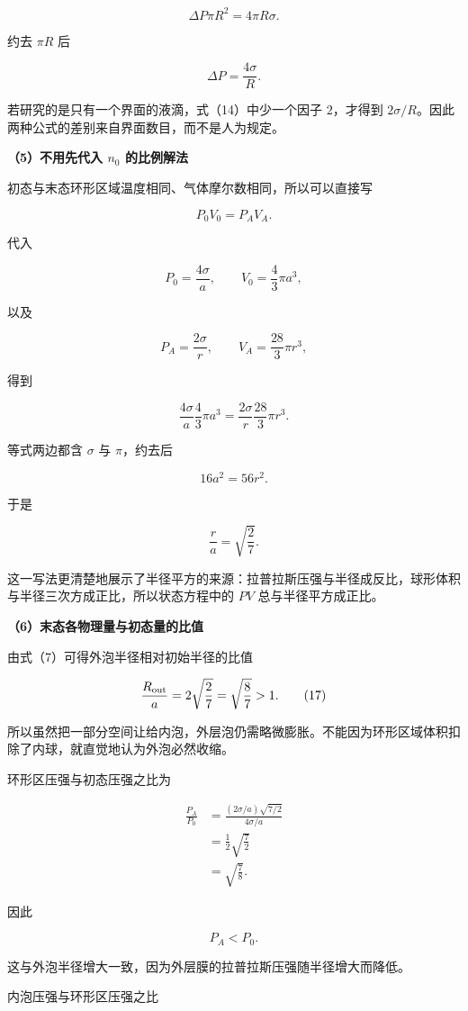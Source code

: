 \documentclass[12pt,a4paper,UTF8]{ctexart}
\begin{document}
\[
\Delta P\pi R^2=4\pi R\sigma.
\]

约去 \(\pi R\) 后

\[
\Delta P=\frac{4\sigma}{R}.
\]

若研究的是只有一个界面的液滴，式（14）中少一个因子 \(2\)，才得到
\(2\sigma/R\)。因此两种公式的差别来自界面数目，而不是人为规定。

\textbf{（5）不用先代入 \(n_0\) 的比例解法}

初态与末态环形区域温度相同、气体摩尔数相同，所以可以直接写

\[
P_0V_0=P_AV_A.
\tag{15}
\]

代入

\[
P_0=\frac{4\sigma}{a},
\qquad
V_0=\frac43\pi a^3,
\]

以及

\[
P_A=\frac{2\sigma}{r},
\qquad
V_A=\frac{28}{3}\pi r^3,
\]

得到

\[
\frac{4\sigma}{a}\frac43\pi a^3
=\frac{2\sigma}{r}\frac{28}{3}\pi r^3.
\]

等式两边都含 \(\sigma\) 与 \(\pi\)，约去后

\[
16a^2=56r^2.
\]

于是

\[
\frac r a=\sqrt{\frac27}.
\tag{16}
\]

这一写法更清楚地展示了半径平方的来源：拉普拉斯压强与半径成反比，球形体积与半径三次方成正比，所以状态方程中的
\(PV\) 总与半径平方成正比。

\textbf{（6）末态各物理量与初态量的比值}

由式（7）可得外泡半径相对初始半径的比值

\[
\frac{R_{\rm out}}a
=2\sqrt{\frac27}
=\sqrt{\frac87}>1.
\tag{17}
\]

所以虽然把一部分空间让给内泡，外层泡仍需略微膨胀。不能因为环形区域体积扣除了内球，就直觉地认为外泡必然收缩。

环形区压强与初态压强之比为

\[
\begin{aligned}
\frac{P_A}{P_0}
&=\frac{(2\sigma/a)\sqrt{7/2}}{4\sigma/a}\\
&=\frac12\sqrt{\frac72}\\
&=\sqrt{\frac78}.
\end{aligned}
\tag{18}
\]

因此

\[
P_A<P_0.
\]

这与外泡半径增大一致，因为外层膜的拉普拉斯压强随半径增大而降低。

内泡压强与环形区压强之比
\end{document}
